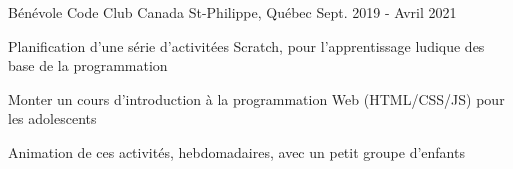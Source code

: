 

\begin{cventries}

  \cventry
    {Bénévole} %
    {Code Club Canada} %
    {St-Philippe, Québec} %
    {Sept. 2019 - Avril 2021} %
    {
      \begin{cvitems} %
        \item {Planification d'une série d'activitées Scratch, pour l'apprentissage ludique des base de la programmation}
        \item {Monter un cours d'introduction à la programmation Web (HTML/CSS/JS) pour les adolescents}
        \item {Animation de ces activités, hebdomadaires, avec un petit groupe d'enfants}
      \end{cvitems}
    }

\end{cventries}
